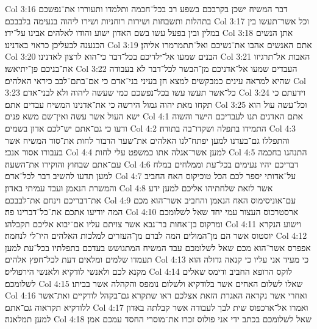 Col 3:16  דבר המשיח ישכן בקרבכם בשפע רב בכל־חכמה ותלמדו ותעוררו את־נפשכם בתהלות ותשבחות ושירות רוחניות ושירו ליהוה בנעימה בלבבכם׃
Col 3:17  וכל אשר־תעשו בין במלין ובין בפעל עשו בשם האדון ישוע והודו לאלהים אבינו על־ידו׃
Col 3:18  אתן הנשים הכנענה לבעליכן כראוי באדנינו׃
Col 3:19  אתם האנשים אהבו את־נשיכם ואל־תתמרמרו אליהן׃
Col 3:20  הבנים שמעו אל־ילדיכם בכל־דבר כי־הוא לרצון לאדנינו׃
Col 3:21  האבות אל־תרגיזו את־בניכם פן־יתיאשו׃
Col 3:22  העבדים שמעו אל־אדניכם מן־הבשר לכל־דבר לא בעבודה שהיא למראה עינים כמבקשים למצא חן בעיני בני־אדם כי אם־בתם־לבב כיראי האלהים׃
Col 3:23  כל־אשר תעשו עשו בכל־נפשכם כמי שעשה ליהוה ולא לבני־אדם׃
Col 3:24  וידעתם כי תקחו מאת יהוה גמול הירשה כי את־אדנינו המשיח עבדים אתם׃
Col 3:25  וכל־עשה עול הוא ישא העול אשר עשה ואין־שם משא פנים׃
Col 4:1  אתם האדנים תנו לעבדיכם הישר והשוה ודעו כי גם־אתם יש־לכם אדון בשמים׃
Col 4:2  התמידו בתפלה ושקדו־בה בתודה׃
Col 4:3  והתפללו גם־בעדנו למען יפתח־לנו האלהים את־שער הדבור לחות את־סוד המשיח אשר בעבורו אסור אנכי׃
Col 4:4  למען אשר־אגלה אתו כמשפט עלי לחות׃
Col 4:5  התנהגו בחכמה עם־אתם שבחוץ והוקירו את־השעה׃
Col 4:6  דבריכם יהיו נעימים בכל־עת וממלחים במלח למען תדעו להשיב דבר לכל־אדם׃
Col 4:7  על־אדותי יספר לכם הכל טוכיקוס האח החביב והמשרת הנאמן ועבד עמיתי באדון׃
Col 4:8  אשר לזאת שלחתיהו אליכם למען ידע את־דבריכם וינחם את־לבבכם׃
Col 4:9  עם־אוניסימוס האח הנאמן והחביב אשר־הוא מכם המה יודיעו אתכם את־כל־דברינו פה׃
Col 4:10  ארסטרכוס העצור עמי יחד שאל לשלומכם ומרקוס בן־אחות בר־נבא אשר צויתם עליו אם־יבוא אליכם תקבלהו׃
Col 4:11  וישוע הנקרא יוסטוס אשר הם מן־המולים המה לבדם מן־העזרים למלכות האלהים היו־לי לנחמה׃
Col 4:12  אפפרס אשר־הוא מכם שאל לשלומכם עבד המשיח המתגושש בעדכם בתפלתיו בכל־עת למען תעמדו שלמים ומלאים דעת לכל־חפץ אלהים׃
Col 4:13  כי מעיד אני עליו כי קנאה גדולה הוא מקנא לכם ולאנשי לודקיא ולאנשי הירפוליס׃
Col 4:14  לוקס הרופא החביב ודימס שאלים לשלומכם׃
Col 4:15  שאלו לשלום האחים אשר בלודקיא ולשלום נומפס והקהלה אשר בביתו׃
Col 4:16  ואחרי אשר נקראה האגרת הזאת אצלכם ראו שתקרא גם־בקהל לודקיים ואת־אשר ללודקיא תקראוה גם־אתם׃
Col 4:17  ואמרו אל־ארכפוס שית לבך לעבודה אשר קבלתה באדון למען תמלאנה׃
Col 4:18  שאל לשלומכם בכתב ידי אני פולוס זכרו את־מוסרי החסד עמכם אמן׃


